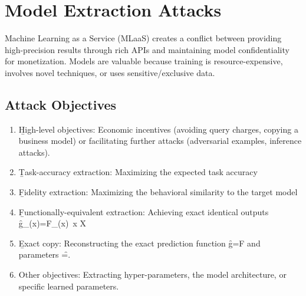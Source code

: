 \section{Model Extraction Attacks}
Machine Learning as a Service (MLaaS) creates a conflict between providing high-precision results through rich APIs and maintaining model confidentiality for monetization. Models are valuable because training is resource-expensive, involves novel techniques, or uses sensitive/exclusive data.


\subsection{Attack Objectives}
\begin{enumerate}
\item \b{High-level objectives}: Economic incentives (avoiding query charges, copying a business model) or facilitating further attacks (adversarial examples, inference attacks).
\item \b{Task-accuracy extraction}: Maximizing the expected task accuracy 
\item \b{Fidelity extraction}: Maximizing the behavioral similarity to the target model 
\item \b{Functionally-equivalent extraction}: Achieving exact identical outputs \f{g_{\hat{\theta}}(x)=F_{\theta}(x)\ \forall x \in X}
\item \b{Exact copy}: Reconstructing the exact prediction function \f{g=F} and parameters \f{\hat{\theta}=\theta}.
\item Other objectives: Extracting hyper-parameters, the model architecture, or specific learned parameters.
\end{enumerate}



